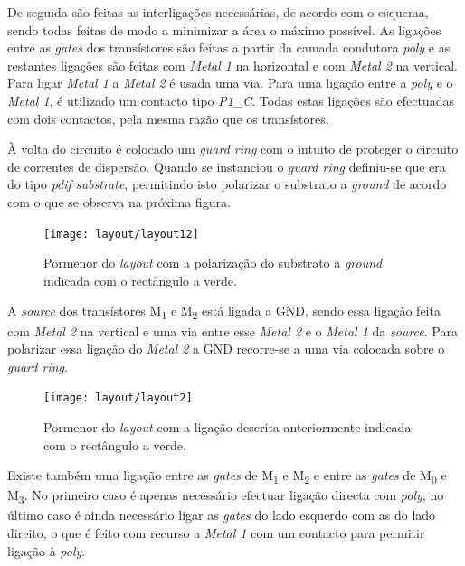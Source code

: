 \documentclass[11pt]{article}
\numberwithin{equation}{section}
\begin{document}
De seguida são feitas as interligações necessárias, de acordo com o esquema, sendo todas feitas de modo a minimizar a área o máximo possível. As ligações entre as \textit{gates} dos transístores são feitas a partir da camada condutora \textit{poly} e as restantes ligações são feitas com \textit{Metal 1} na horizontal e com \textit{Metal 2} na vertical. Para ligar \textit{Metal 1} a \textit{Metal 2} é usada uma via. Para uma ligação entre a \textit{poly} e o \textit{Metal 1}, é utilizado um contacto tipo \textit{P1\_C}. Todas estas ligações são efectuadas com dois contactos, pela mesma razão que os transístores.

À volta do circuito é colocado um \textit{guard ring} com o intuito de proteger o circuito de correntes de dispersão. Quando se instanciou o \textit{guard ring} definiu-se que era do tipo \textit{pdif substrate}, permitindo isto polarizar o substrato a \textit{ground} de acordo com o que se observa na próxima figura.

\begin{figure}[H]
	\centering
	\texttt{[image: layout/layout12]}
	\vspace{-0.8em}
	\caption{Pormenor do \textit{layout} com a polarização do substrato a \textit{ground} indicada com o rectângulo a verde.}
	\vspace{-0.8em}
\end{figure}

A \textit{source} dos transístores M\textsubscript{1} e M\textsubscript{2} está ligada a GND, sendo essa ligação feita com \textit{Metal 2} na vertical e uma via entre esse \textit{Metal 2} e o \textit{Metal 1} da \textit{source}. Para polarizar essa ligação do \textit{Metal 2} a GND recorre-se a uma via colocada sobre o \textit{guard ring}.

\begin{figure}[H]
	\centering
	\texttt{[image: layout/layout2]}
	\vspace{-0.8em}
	\caption{Pormenor do \textit{layout} com a ligação descrita anteriormente indicada com o rectângulo a verde.}
	\vspace{-0.8em}
\end{figure}

Existe também uma ligação entre as \textit{gates} de M\textsubscript{1} e M\textsubscript{2} e entre as \textit{gates} de M\textsubscript{0} e M\textsubscript{3}. No primeiro caso é apenas necessário efectuar ligação directa com \textit{poly}, no último caso é ainda necessário ligar as \textit{gates} do lado esquerdo com as do lado direito, o que é feito com recurso a \textit{Metal 1} com um contacto para permitir ligação à \textit{poly}.
\end{document}
